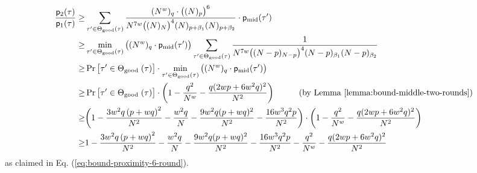 \begin{align*}
\frac{\mathsf{p}_{2}(\tau)}{\mathsf{p}_{1}(\tau)}   \geq  &
\sum_{\tau^{\prime} \in \Theta_{\mathrm{good}}(\tau)}
\frac{(N^w)_q\cdot\big((N)_p\big)^6}{N^{7w}\big((N)_{N}\big)^4(N)_{p+\beta_1}(N)_{p+\beta_2}}\cdot \mathsf{p}_{\mathrm{mid}}(\tau')         \\
\geq  &    \min_{\tau' \in \Theta_{\mathrm{good}}(\tau)}\big((N^w)_q\cdot\mathsf{p}_{\mathrm{mid}}(\tau')\big)
\sum_{\tau^{\prime} \in \Theta_{\mathrm{good}}(\tau)}
	\frac{1}{N^{7w}\big((N-p)_{N-p}\big)^4(N-p)_{\beta_1}(N-p)_{\beta_2}}    \\
\geq & \Pr\big[ \tau' \in \Theta_{\text {good }}(\tau)\big]\cdot
\min_{\tau' \in \Theta_{\mathrm{good}}(\tau)}\big((N^w)_q\cdot\mathsf{p}_{\mathrm{mid}}(\tau')\big)        \\
\geq & \Pr\big[ \tau' \in \Theta_{\text {good }}(\tau)\big]\cdot
\bigg(1-\frac{q^2}{N^w}-\frac{q(2wp+6w^2q)^2}{N^2}\bigg)\ \ \ \ \ \ \ \ \ (\text{by Lemma }\ref{lemma:bound-middle-two-rounds})        \\
\geq &    \bigg(1-\frac{3w^{2} q \left(p+w q\right)^{2}}{N^{2}} - \frac{w^{2} q}{N} - \frac{9w^2 q (p+w q)^{2}}{N^2}- \frac{16w^3q^2p}{N^2}\bigg)\cdot\bigg(1-\frac{q^2}{N^w}-\frac{q(2wp+6w^2q)^2}{N^2}\bigg)     \notag      \\
\geq  &  1-\frac{3w^{2} q \left(p+w q\right)^{2}}{N^{2}} - \frac{w^{2} q}{N} - \frac{9w^2 q (p+w q)^{2}}{N^2}- \frac{16w^3q^2p}{N^2}-\frac{q^2}{N^w}-\frac{q(2wp+6w^2q)^2}{N^2}     \notag   
\end{align*}
%
as claimed in Eq. (\ref{eq:bound-proximity-6-round}).
